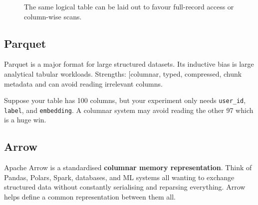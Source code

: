 \begin{figure}[htbp]
{%
    }
    
    \caption{The same logical table can be laid out to favour full-record access or column-wise scans.}
    \label{fig:row-v-column}
\end{figure}

\subsection{Parquet}

Parquet is a major format for large structured datasets.
Its inductive bias is large analytical tabular workloads.
Strengths: [columnar, typed, compressed, chunk metadata and can avoid reading irrelevant columns.

Suppose your table has 100 columns, but your experiment only needs \texttt{user\_id}, \texttt{label}, and \texttt{embedding}.
A columnar system may avoid reading the other 97 which is a huge win.

\subsection{Arrow}

Apache Arrow is a standardised \textbf{columnar memory representation}.
Think of Pandas, Polars, Spark, databases, and ML systems all wanting to exchange structured data without constantly serialising and reparsing everything.
Arrow helps define a common representation between them all.


